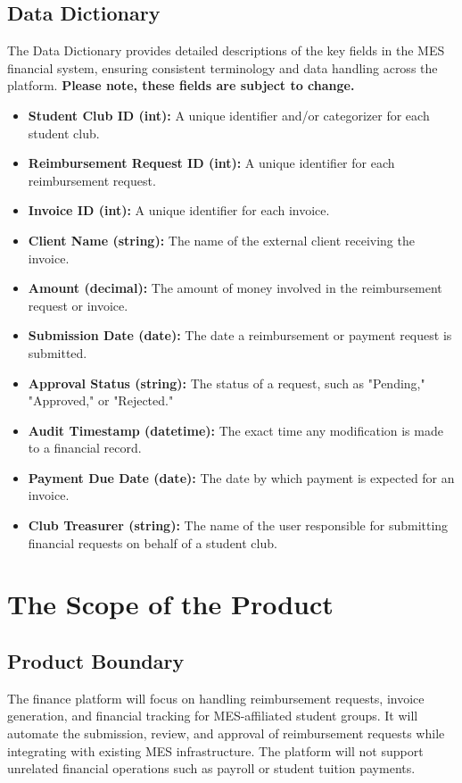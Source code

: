 \documentclass[12pt]{article}
\begin{document}
\subsection{Data Dictionary}
The Data Dictionary provides detailed descriptions of the key fields in the MES financial system, ensuring consistent terminology and data handling across the platform. \textbf{Please note, these fields are subject to change.}

\begin{itemize}
    \item \textbf{Student Club ID (int):} A unique identifier and/or categorizer for each student club.
    \item \textbf{Reimbursement Request ID (int):} A unique identifier for each reimbursement request.
    \item \textbf{Invoice ID (int):} A unique identifier for each invoice. 
    \item \textbf{Client Name (string):} The name of the external client receiving the invoice.
    \item \textbf{Amount (decimal):} The amount of money involved in the reimbursement request or invoice.
    \item \textbf{Submission Date (date):} The date a reimbursement or payment request is submitted.
    \item \textbf{Approval Status (string):} The status of a request, such as "Pending," "Approved," or "Rejected."
    \item \textbf{Audit Timestamp (datetime):} The exact time any modification is made to a financial record.
    \item \textbf{Payment Due Date (date):} The date by which payment is expected for an invoice.
    \item \textbf{Club Treasurer (string):} The name of the user responsible for submitting financial requests on behalf of a student club.
\end{itemize}

\section{The Scope of the Product}
\subsection{Product Boundary}
The finance platform will focus on handling reimbursement requests, invoice generation, and financial tracking for MES-affiliated student groups. It will automate the submission, review, and approval of reimbursement requests while integrating with existing MES infrastructure. The platform will not support unrelated financial operations such as payroll or student tuition payments.
\end{document}
